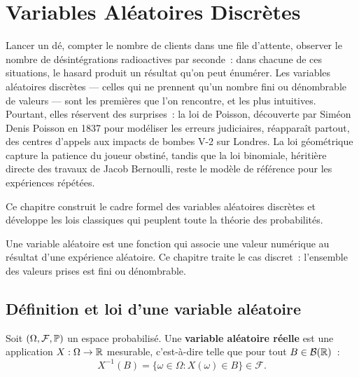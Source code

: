 \chapter{Variables Al\'eatoires Discr\`etes}
\label{ch:discretes}

Lancer un d\'e, compter le nombre de clients dans une file d'attente, observer le nombre de d\'esint\'egrations radioactives par seconde~: dans chacune de ces situations, le hasard produit un r\'esultat qu'on peut \'enum\'erer. Les variables al\'eatoires discr\`etes --- celles qui ne prennent qu'un nombre fini ou d\'enombrable de valeurs --- sont les premi\`eres que l'on rencontre, et les plus intuitives. Pourtant, elles r\'eservent des surprises~: la loi de Poisson, d\'ecouverte par Sim\'eon Denis Poisson en 1837 pour mod\'eliser les erreurs judiciaires, r\'eappara\^it partout, des centres d'appels aux impacts de bombes V-2 sur Londres. La loi g\'eom\'etrique capture la patience du joueur obstin\'e, tandis que la loi binomiale, h\'eriti\`ere directe des travaux de Jacob Bernoulli, reste le mod\`ele de r\'ef\'erence pour les exp\'eriences r\'ep\'et\'ees.

Ce chapitre construit le cadre formel des variables al\'eatoires discr\`etes et d\'eveloppe les lois classiques qui peuplent toute la th\'eorie des probabilit\'es.

\begin{intuition}
Une variable al\'eatoire est une fonction qui associe une valeur num\'erique au
r\'esultat d'une exp\'erience al\'eatoire. Ce chapitre traite le cas discret~:
l'ensemble des valeurs prises est fini ou d\'enombrable.
\end{intuition}

\section{D\'efinition et loi d'une variable al\'eatoire}

\begin{definition}
Soit $(\Omega, \mathcal{F}, \mathbb{P})$ un espace probabilis\'e. Une \textbf{variable
al\'eatoire r\'eelle} est une application $X : \Omega \to \mathbb{R}$ mesurable, c'est-\`a-dire
telle que pour tout $B \in \mathcal{B}(\mathbb{R})$~:
\[
    X^{-1}(B) = \{\omega \in \Omega : X(\omega) \in B\} \in \mathcal{F}.
\]
\end{definition}

